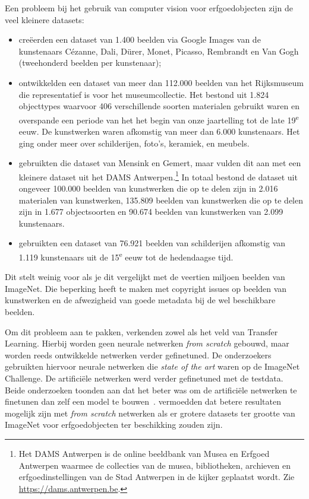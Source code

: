 Een probleem bij het gebruik van computer vision voor erfgoedobjecten zijn de veel kleinere datasets: 
\begin{itemize}
	\item \textcite{Blessings2013} cre\"{e}erden een dataset van 1.400 beelden via Google Images van de kunstenaars C\'{e}zanne, Dali, D\"{u}rer, Monet, Picasso, Rembrandt en Van Gogh (tweehonderd beelden per kunstenaar);
	\item \textcite{Mensink2014} ontwikkelden een dataset van meer dan 112.000 beelden van het Rijksmuseum die representatief is voor het museumcollectie. Het bestond uit 1.824 objecttypes waarvoor 406 verschillende soorten materialen gebruikt waren en overspande een periode van het het begin van onze jaartelling tot de late 19\textsuperscript{e} eeuw. De kunstwerken waren afkomstig van meer dan 6.000 kunstenaars. Het ging onder meer over schilderijen, foto’s, keramiek, en meubels.
	\item \textcite{Sabatteli2018} gebruikten die dataset van Mensink en Gemert, maar vulden dit aan met een kleinere dataset uit het DAMS Antwerpen.\footnote{Het DAMS Antwerpen is de online beeldbank van Musea en Erfgoed Antwerpen waarmee de collecties van de musea, bibliotheken, archieven en erfgoedinstellingen van de Stad Antwerpen in de kijker geplaatst wordt. Zie \url{https://dams.antwerpen.be}.} In totaal bestond de dataset uit ongeveer 100.000 beelden van kunstwerken die op te delen zijn in 2.016 materialen van kunstwerken, 135.809 beelden van kunstwerken die op te delen zijn in 1.677 objectsoorten en 90.674 beelden van kunstwerken van 2.099 kunstenaars.
	\item \textcite{Elgammal2018} gebruikten een dataset van 76.921 beelden van schilderijen afkomstig van 1.119 kunstenaars uit de 15\textsuperscript{e} eeuw tot de hedendaagse tijd.
\end{itemize}

Dit stelt weinig voor als je dit vergelijkt met de veertien miljoen beelden van ImageNet. Die beperking heeft te maken met copyright issues op beelden van kunstwerken en de afwezigheid van goede metadata bij de wel beschikbare beelden. 

Om dit probleem aan te pakken, verkenden zowel \textcite{Sabatteli2018} als \textcite{Elgammal2018} het veld van Transfer Learning. Hierbij worden geen neurale netwerken \textit{from scratch} gebouwd, maar worden reeds ontwikkelde netwerken verder gefinetuned. De onderzoekers gebruikten hiervoor neurale netwerken die \textit{state of the art} waren op de ImageNet Challenge. De artifici\"{e}le netwerken werd verder gefinetuned met de testdata. Beide onderzoeken toonden aan dat het beter was om de artificiële netwerken te finetunen dan zelf een model te bouwen~\autocite{Sabatteli2018}. \textcite{Elgammal2018} vermoedden dat betere resultaten mogelijk zijn met \textit{from scratch} netwerken als er grotere datasets ter grootte van ImageNet voor erfgoedobjecten ter beschikking zouden zijn.

